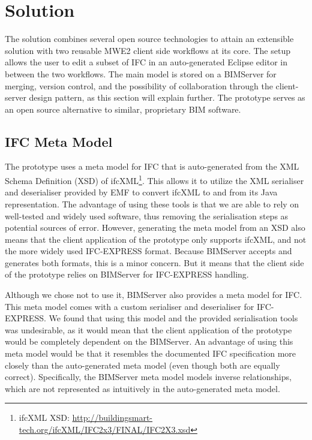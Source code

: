 \section{Solution}
\label{sec:solution}
The solution combines several open source technologies to attain an extensible solution with two reusable MWE2 client side workflows at its core. The setup allows the user to edit a subset of IFC in an auto-generated Eclipse editor in between the two workflows. The main model is stored on a BIMServer for merging, version control, and the possibility of collaboration through the client-server design pattern, as this section will explain further. The prototype serves as an open source alternative to similar, proprietary BIM software.

\subsection{IFC Meta Model}
\label{subsec:ifc_meta_model}
The prototype uses a meta model for IFC that is auto-generated from the XML Schema Definition (XSD) of ifcXML\footnote{ifcXML XSD: \url{http://buildingsmart-tech.org/ifcXML/IFC2x3/FINAL/IFC2X3.xsd}}. This allows it to utilize the XML serialiser and deserialiser provided by EMF to convert ifcXML to and from its Java representation. The advantage of using these tools is that we are able to rely on well-tested and widely used software, thus removing the serialisation steps as potential sources of error. However, generating the meta model from an XSD also means that the client application of the prototype only supports ifcXML, and not  the more widely used IFC-EXPRESS format. Because BIMServer accepts and generates both formats, this is a minor concern. But it means that the client side of the prototype relies on BIMServer for IFC-EXPRESS handling.

Although we chose not to use it, BIMServer also provides a meta model for IFC. This meta model comes with a custom serialiser and deserialiser for IFC-EXPRESS. We found that using this model and the provided serialisation tools was undesirable, as it would mean that the client application of the prototype would be completely dependent on the BIMServer. An advantage of using this meta model would be that it resembles the documented IFC specification more closely than the auto-generated meta model (even though both are equally correct). Specifically, the BIMServer meta model models inverse relationships, which are not represented as intuitively in the auto-generated meta model.

